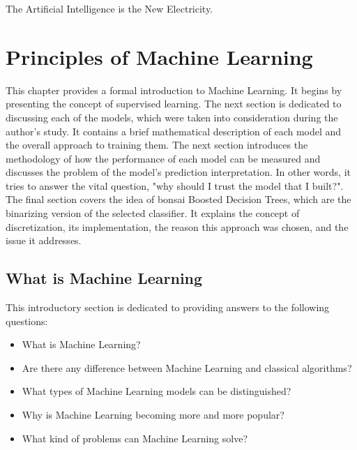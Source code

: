\begin{savequote}[75mm] 
The Artificial Intelligence is the New Electricity.
\end{savequote}

\chapter{Principles of Machine Learning}
\label{chapter:ML}
This chapter provides a formal introduction to Machine Learning. It begins by presenting the concept of supervised learning. The next section is dedicated to discussing each of the models, which were taken into consideration during the author's study. It contains a brief mathematical description of each model and the overall approach to training them. The next section introduces the methodology of how the performance of each model can be measured and discusses the problem of the model's prediction interpretation. In other words, it tries to answer the vital question, "why should I trust the model that I built?". 
The final section covers the idea of bonsai Boosted Decision Trees, which are the binarizing version of the selected classifier. It explains the concept of discretization, its implementation, the reason this approach was chosen, and the issue it addresses. 

\section{What is Machine Learning}
This introductory section is dedicated to providing answers to the following questions: 
\begin{itemize}
    \item What is Machine Learning? 
    \item Are there any difference between Machine Learning and classical algorithms? 
    \item What types of Machine Learning models can be distinguished? 
    \item Why is Machine Learning becoming more and more popular? 
    \item What kind of problems can Machine Learning solve? 
\end{itemize}

